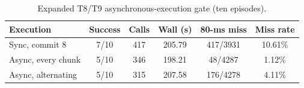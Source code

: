 \begin{table}
\caption{Expanded T8/T9 asynchronous-execution gate (ten episodes).}
\label{tab:prefetch}
\centering\footnotesize
\begin{tabular}{lccccc}
\toprule
Execution & Success & Calls & Wall (s) & 80-ms miss & Miss rate \\
\midrule
Sync, commit 8 & 7/10 & 417 & 205.79 & 417/3931 & 10.61\% \\
Async, every chunk & 5/10 & 346 & 198.21 & 48/4287 & 1.12\% \\
Async, alternating & 5/10 & 315 & 207.58 & 176/4278 & 4.11\% \\
\bottomrule
\end{tabular}
\end{table}
